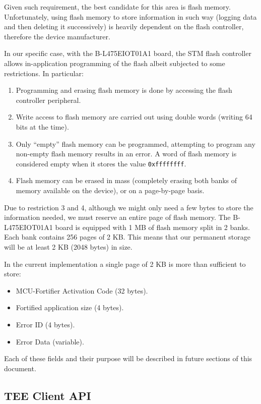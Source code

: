 \documentclass{article}
\begin{document}
Given such requirement, the best candidate for this area is flash memory. Unfortunately, using flash memory to store information in such way (logging data and then deleting it successively) is heavily dependent on the flash controller, therefore the device manufacturer.

In our specific case, with the B-L475EIOT01A1 board, the STM flash controller allows in-application programming of the flash albeit subjected to some restrictions. In particular:
\begin{enumerate}
	\item Programming and erasing flash memory is done by accessing the flash controller peripheral.
	\item Write access to flash memory are carried out using double words (writing 64 bits at the time).
	\item Only ``empty'' flash memory can be programmed, attempting to program any non-empty flash memory results in an error. A word of flash memory is considered empty when it stores the value \verb|0xffffffff|.
	\item Flash memory can be erased in mass (completely erasing both banks of memory available on the device), or on a page-by-page basis.
\end{enumerate}

Due to restriction 3 and 4, although we might only need a few bytes to store the information needed, we must reserve an entire page of flash memory. The B-L475EIOT01A1 board is equipped with 1 MB of flash memory split in 2 banks. Each bank contains 256 pages of 2 KB. This means that our permanent storage will be at least 2 KB (2048 bytes) in size.

In the current implementation a single page of 2 KB is more than sufficient to store:
\begin{itemize}
\item MCU-Fortifier Activation Code (32 bytes).
\item Fortified application size (4 bytes).
\item Error ID (4 bytes).
\item Error Data (variable).
\end{itemize}

Each of these fields and their purpose will be described in future sections of this document.

\subsection{TEE Client API}
\end{document}
